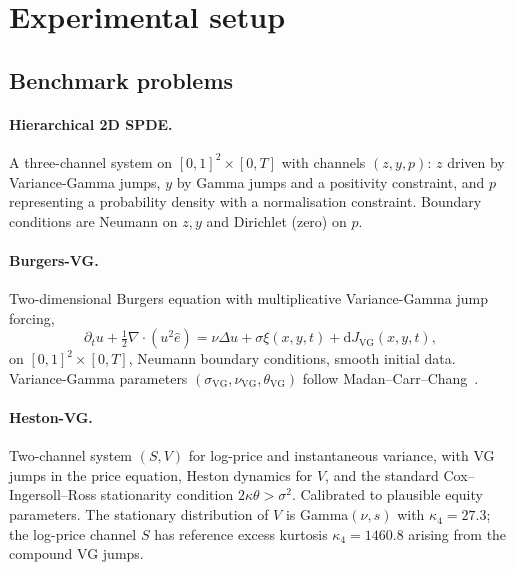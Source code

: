 \documentclass[review,12pt]{elsarticle}
\begin{document}
\section{Experimental setup}
\label{sec:setup}

\subsection{Benchmark problems}
\label{subsec:problems}

\paragraph{Hierarchical 2D SPDE.}
A three-channel system on \([0,1]^2 \times [0, T]\) with channels
\((z, y, p)\): \(z\) driven by Variance-Gamma jumps, \(y\) by
Gamma jumps and a positivity constraint, and \(p\) representing a
probability density with a normalisation constraint. Boundary
conditions are Neumann on \(z, y\) and Dirichlet (zero) on \(p\).

\paragraph{Burgers-VG.}
Two-dimensional Burgers equation with multiplicative
Variance-Gamma jump forcing,
\begin{equation}
\partial_t u + \tfrac12 \nabla \cdot (u^2 \hat e)
= \nu \Delta u + \sigma \xi(x, y, t)
+ \mathrm dJ_{\mathrm{VG}}(x, y, t),
\label{eq:burgersvg}
\end{equation}
on \([0,1]^2 \times [0, T]\), Neumann boundary conditions, smooth
initial data. Variance-Gamma parameters
\((\sigma_{\mathrm{VG}}, \nu_{\mathrm{VG}}, \theta_{\mathrm{VG}})\)
follow Madan--Carr--Chang~\cite{MadanCarrChang1998}.

\paragraph{Heston-VG.}
Two-channel system \((S, V)\) for log-price and instantaneous
variance, with VG jumps in the price equation, Heston dynamics for
\(V\), and the standard Cox--Ingersoll--Ross stationarity
condition \(2\kappa\theta > \sigma^2\). Calibrated to plausible
equity parameters. The stationary distribution of \(V\) is
Gamma\((\nu, s)\) with \(\kappa_4 = 27.3\); the log-price channel
\(S\) has reference excess kurtosis \(\kappa_4 = 1460.8\) arising
from the compound VG jumps.
\end{document}
